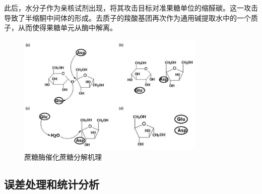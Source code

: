 此后，水分子作为亲核试剂出现，将其攻击目标对准果糖单位的缩醛碳。这一攻击导致了半缩酮中间体的形成。去质子的羧酸基团再次作为通用碱提取水中的一个质子，从而使得果糖单元从酶中解离。

\begin{figure}[H]
    \centering
    \includegraphics[width = 0.8\textwidth]{figure/principles/mechanism.png}
    \caption{蔗糖酶催化蔗糖分解机理\cite{pang2019structural}}
    \label{fig:mechanism}
\end{figure}
\subsection{误差处理和统计分析}
